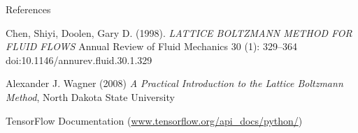 \documentclass{beamer}
\begin{document}
\begin{frame}{References}

\begin{thebibliography}{}\tiny

 Chen, Shiyi, Doolen, Gary D. (1998). \emph{LATTICE BOLTZMANN METHOD FOR FLUID FLOWS} Annual Review of Fluid Mechanics 30 (1): 329–364 doi:10.1146/annurev.fluid.30.1.329

 Alexander J. Wagner (2008) \emph{A Practical Introduction to the Lattice Boltzmann Method}, North Dakota State University

 TensorFlow Documentation (\url{www.tensorflow.org/api_docs/python/})

\end{thebibliography}

\end{frame}
\end{document}
